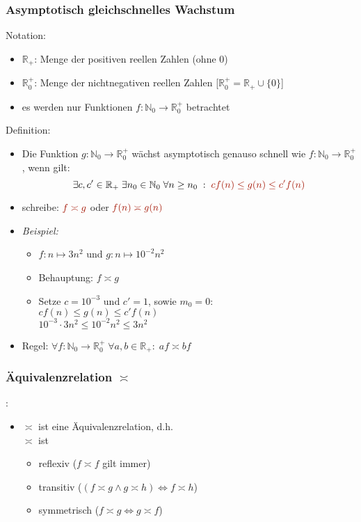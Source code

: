 \documentclass{article}
\newcommand{\Nz}{{\mathbb{N}_0}} %
\newcommand{\R}{\mathbb{R}} %
\newcommand{\important}[1]{\textcolor{importantColor}{#1}}
\newcommand{\example}[1]{\textit{Beispiel: }#1}
\newcommand{\set}[1]{\{#1\}}
\begin{document}
\subsubsection{Asymptotisch gleichschnelles Wachstum}
Notation:
\begin{itemize}
    \item $\R_+$: Menge der positiven reellen Zahlen (ohne 0)
    \item $\R_0^+$: Menge der nichtnegativen reellen Zahlen [$\R_0^+=\R_+\cup\set{0}$]
    \item es werden nur Funktionen $f:\Nz\to\R_0^+$ betrachtet
\end{itemize}
Definition:
\begin{itemize}
    \item Die Funktion $g:\Nz\to\R_0^+$ wächst \important{asymptotisch genauso schnell} wie $f:\Nz\to\R_0^+$, wenn gilt:
    \[
        \exists c,c'\in\R_+\;\exists n_0\in\Nz\;\forall n\geq n_0\;:\;\important{cf(n)\leq g(n)\leq c'f(n)}
    \]
    \item schreibe: $\important{f\asymp g}$ oder $\important{f(n)\asymp g(n)}$
    \item \example{
        \begin{itemize}
            \item $f: n\mapsto 3n^2$ und $g: n\mapsto 10^{-2}n^2$
            \item Behauptung: $f\asymp g$
            \item Setze $c=10^{-3}$ und $c'=1$, sowie $m_0=0$:\\
            $cf(n)\leq g(n)\leq c'f(n)$\\
            $10^{-3}\cdot 3n^2\leq 10^{-2}n^2\leq 3n^2$
        \end{itemize}
    }
    \item Regel: $\forall f:\Nz\to\R_0^+\;\forall a,b\in \R_+:\;af\asymp bf$
\end{itemize}
\subsubsection{Äquivalenzrelation $\asymp$}:
\begin{itemize}
    \item $\asymp$ ist eine Äquivalenzrelation, d.h.\\
    $\asymp$ ist
    \begin{itemize}
        \item reflexiv ($f\asymp f$ gilt immer)
        \item transitiv ($(f\asymp g \land g \asymp h) \iff f\asymp h$)
        \item symmetrisch ($f\asymp g \iff g\asymp f$)
    \end{itemize}
\end{itemize}
\end{document}
